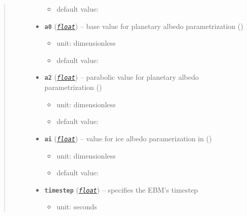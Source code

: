 \documentclass[a4paper,10pt,english]{sphinxmanual}
\begin{document}
\begin{fulllineitems}
\begin{quote}
\begin{description}
\begin{itemize}
\begin{itemize}
\item {} 
default value: 

\end{itemize}


\item {} 
\textbf{\texttt{a0}} (\href{http://docs.python.org/2.7/library/functions.html\#float}{\emph{\texttt{float}}}) -- 
base value for planetary albedo parametrization
{\hyperref[api/climlab.surface:climlab.surface.albedo.StepFunctionAlbedo]{\emph{}}} ()
\begin{itemize}
\item {} 
unit: dimensionless

\item {} 
default value: 

\end{itemize}


\item {} 
\textbf{\texttt{a2}} (\href{http://docs.python.org/2.7/library/functions.html\#float}{\emph{\texttt{float}}}) -- 
parabolic value for planetary  albedo parametrization
{\hyperref[api/climlab.surface:climlab.surface.albedo.StepFunctionAlbedo]{\emph{}}} ()
\begin{itemize}
\item {} 
unit: dimensionless

\item {} 
default value: 

\end{itemize}


\item {} 
\textbf{\texttt{ai}} (\href{http://docs.python.org/2.7/library/functions.html\#float}{\emph{\texttt{float}}}) -- 
value for ice albedo paramerization in
{\hyperref[api/climlab.surface:climlab.surface.albedo.StepFunctionAlbedo]{\emph{}}} ()
\begin{itemize}
\item {} 
unit: dimensionless

\item {} 
default value: 

\end{itemize}


\item {} 
\textbf{\texttt{timestep}} (\href{http://docs.python.org/2.7/library/functions.html\#float}{\emph{\texttt{float}}}) -- 
specifies the EBM's timestep
\begin{itemize}
\item {} 
unit: seconds


\end{itemize}
\end{itemize}
\end{description}
\end{quote}
\end{fulllineitems}
\end{document}
